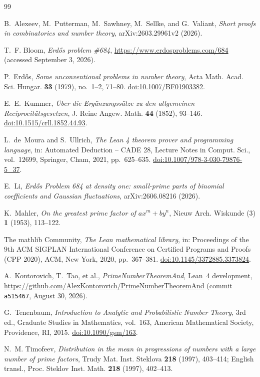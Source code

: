 \documentclass[11pt]{article}
\theoremstyle{remark}
\begin{document}
\begin{thebibliography}{99}
\small
\setlength{\itemsep}{1pt}

B.~Alexeev, M.~Putterman, M.~Sawhney, M.~Sellke, and G.~Valiant,
\emph{Short proofs in combinatorics and number theory},
arXiv:2603.29961v2 (2026).

T.~F. Bloom,
\emph{Erd\H{o}s problem \#684},
\url{https://www.erdosproblems.com/684}
(accessed September 3, 2026).

P.~Erd\H{o}s,
\emph{Some unconventional problems in number theory},
Acta Math. Acad. Sci. Hungar. \textbf{33} (1979), no.~1--2, 71--80.
\href{https://doi.org/10.1007/BF01903382}{doi:10.1007/BF01903382}.

E.~E.~Kummer,
\emph{{\"U}ber die Erg{\"a}nzungss{\"a}tze zu den allgemeinen
Reciprocit{\"a}tsgesetzen},
J. Reine Angew. Math. \textbf{44} (1852), 93--146.
\href{https://doi.org/10.1515/crll.1852.44.93}{doi:10.1515/crll.1852.44.93}.

L.~de~Moura and S.~Ullrich,
\emph{The Lean 4 theorem prover and programming language},
in: Automated Deduction -- CADE 28, Lecture Notes in Comput. Sci., vol.~12699,
Springer, Cham, 2021, pp.~625--635.
\href{https://doi.org/10.1007/978-3-030-79876-5_37}{doi:10.1007/978-3-030-79876-5\_37}.

E.~Li,
\emph{Erd\H{o}s Problem 684 at density one: small-prime parts of
binomial coefficients and Gaussian fluctuations},
arXiv:2606.08216 (2026).

K.~Mahler,
\emph{On the greatest prime factor of $ax^m+by^n$},
Nieuw Arch. Wiskunde (3) \textbf{1} (1953), 113--122.

The mathlib Community,
\emph{The Lean mathematical library},
in: Proceedings of the 9th ACM SIGPLAN International Conference on Certified
Programs and Proofs (CPP 2020), ACM, New York, 2020, pp.~367--381.
\href{https://doi.org/10.1145/3372885.3373824}{doi:10.1145/3372885.3373824}.

A.~Kontorovich, T.~Tao, et al.,
\emph{PrimeNumberTheoremAnd}, Lean~4 development,
\url{https://github.com/AlexKontorovich/PrimeNumberTheoremAnd}
(commit \texttt{a515467}, August 30, 2026).

G.~Tenenbaum,
\emph{Introduction to Analytic and Probabilistic Number Theory},
3rd ed., Graduate Studies in Mathematics, vol.~163,
American Mathematical Society, Providence, RI, 2015.
\href{https://doi.org/10.1090/gsm/163}{doi:10.1090/gsm/163}.

N.~M. Timofeev,
\emph{Distribution in the mean in progressions of numbers with a large
number of prime factors},
Trudy Mat. Inst. Steklova \textbf{218} (1997), 403--414;
English transl., Proc. Steklov Inst. Math. \textbf{218} (1997), 402--413.

\end{thebibliography}
\end{document}
